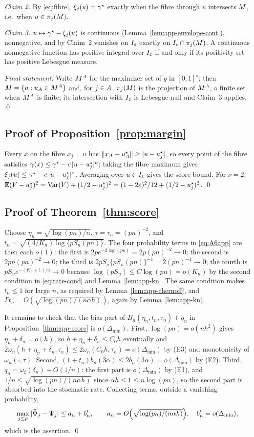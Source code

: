 \emph{Claim 2.}  By \eqref{eq:fibre}, $\xi_j(u)=\gamma^\star$ exactly when the
fibre through $u$ intersects $M$, i.e.\ when $u\in\pi_j(M)$.

\emph{Claim 3.}  $u\mapsto\gamma^\star-\xi_j(u)$ is continuous
(Lemma~\ref{lem:app-envelope-cont}), nonnegative, and by Claim~2 vanishes
on $I_\varepsilon$ exactly on $I_\varepsilon\cap\pi_j(M)$.  A continuous nonnegative function
has positive integral over $I_\varepsilon$ if and only if its positivity set has
positive Lebesgue measure.

\emph{Final statement.}  Write $M^{A}$ for the maximizer set of $g$ in
$[0,1]^{s}$; then $M=\{u:u_{A}\in M^{A}\}$ and, for $j\in A$,
$\pi_j(M)$ is the projection of $M^{A}$, a finite set when $M^{A}$ is
finite; its intersection with $I_\varepsilon$ is Lebesgue-null and Claim~3 applies.
\qed

\subsection{Proof of Proposition~\ref{prop:margin}}

Every $x$ on the fibre $x_j=u$ has
$\|x_{A}-u^\star_{A}\|\ge|u-u^\star_j|$, so every point of the fibre
satisfies
$\gamma(x)\le\gamma^\star-c\,|u-u^\star_j|^\nu$; taking the fibre maximum gives
$\xi_j(u)\le\gamma^\star-c\,|u-u^\star_j|^\nu$.  Averaging
over $u\in I_\varepsilon$ gives the score bound.  For $\nu=2$,
$\mathbb E(V-u_j^\star)^2=\mathrm{Var}(V)+(1/2-u_j^\star)^2
=(1-2\varepsilon)^2/12+(1/2-u_j^\star)^2$.  \qed

\subsection{Proof of Theorem~\ref{thm:score}}

Choose $\eta_n=\sqrt{\log(pn)/n}$, $\tau=\tau_n=(pn)^{-2}$, and
$t_n=\sqrt{(4/K_n)\log\{pS_n(pn)\}}$.  The four probability terms in
\eqref{eq:A6app} are then each $o(1)$: the first is
$2pe^{-2\log(pn)}=2p(pn)^{-2}\to0$; the second is $2pn(pn)^{-2}\to0$; the
third is $2pS_n\{pS_n(pn)\}^{-1}=2(pn)^{-1}\to0$; the fourth is
$pS_ne^{-(K_n+1)/4}\to0$ because $\log(pS_n)\le C\log(pn)=o(K_n)$ by the
second condition in \eqref{eq:rate-cond} and
Lemma~\ref{lem:app-kn}.  The same condition makes $t_n\le1$ for large
$n$, as required by Lemma~\ref{lem:app-chernoff}, and
$\Gamma t_n=O(\sqrt{\log(pn)/(n\alpha h)})$, again by
Lemma~\ref{lem:app-kn}.

It remains to check that the bias part of $B_n(\eta_n,t_n,\tau_n)+q_n$ in
Proposition~\ref{thm:app-score} is
$o(\Delta_{\min})$.  First, $\log(pn)=o(nh^2)$ gives
$\eta_n+\delta_n=o(h)$, so $h+\eta_n+\delta_n\le C_0h$ eventually and
$2\omega_n(h+\eta_n+\delta_n,\tau_n)\le2\omega_n(C_0h,\tau_n)
=o(\Delta_{\min})$ by (E3) and monotonicity of
$\omega_n(\cdot,\tau)$.  Second,
$(1+t_n)b_n(3\alpha)\le2b_n(3\alpha)=o(\Delta_{\min})$ by (E2).  Third,
$q_n=\omega_\xi(\delta_n)+O(1/n)$: the first part is
$o(\Delta_{\min})$ by (E1), and
$1/n\le\sqrt{\log(pn)/(n\alpha h)}$ since $\alpha h\le1\le n\log(pn)$, so
the second part is absorbed into the stochastic rate.  Collecting terms,
outside a vanishing probability,
\[
 \max_{j\le p}|\widehat\Psi_j-\Psi_j|
 \le a_n+b_n',\qquad
 a_n=O\Bigl(\sqrt{\log(pn)/(n\alpha h)}\Bigr),\quad
 b_n'=o(\Delta_{\min}),
\]
which is the assertion.  \qed

